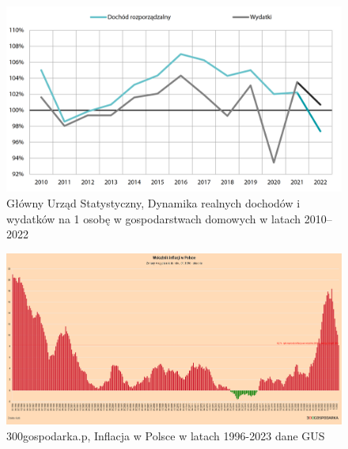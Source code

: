 \documentclass[a4paper,10pt, twoside]{report}
\begin{document}
\begin{figure}[H]           %
    \caption{Główny Urząd Statystyczny, Dynamika realnych dochodów i wydatków na 1 osobę w gospodarstwach domowych
    w latach 2010–2022\cite{gussytuacjabudzetowa}}
    \label{fig:}
    \centering  
    \includegraphics[width=12cm]{figures/GUS_dynamikarealnychdochodowiwydatkow2010-2020.png}
\end{figure}

\begin{figure}[H]           %
    \caption{300gospodarka.p, Inflacja w Polsce w latach 1996-2023 dane GUS}
    \label{fig:}
    \centering  
    \includegraphics[width=12cm]{figures/300gospodarka-pl_inflacjawpolsce.png}
\end{figure}
\end{document}
